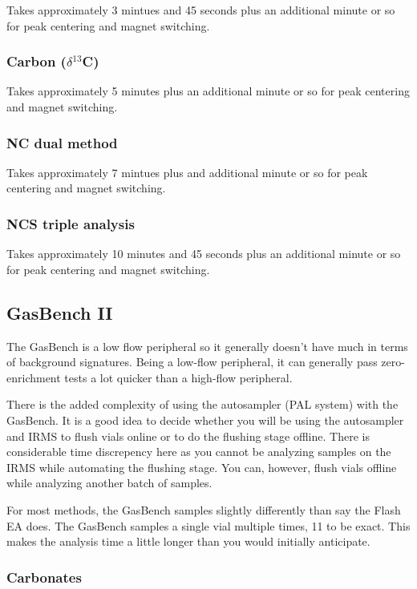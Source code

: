 \documentclass[12pt]{../SOP4_alpha}\usepackage[]{graphicx}\usepackage[]{color}
\begin{document}
\NP Takes approximately 3 mintues and 45 seconds plus an additional minute or so for peak centering and magnet switching.

\subsubsection{Carbon ($\delta$$^{13}$C)}

\NP Takes approximately 5 minutes plus an additional minute or so for peak centering and magnet switching.

\subsubsection{NC dual method}

\NP Takes approximately 7 mintues plus and additional minute or so for peak centering and magnet switching.

\subsubsection{NCS triple analysis} 

\NP Takes approximately 10 minutes and 45 seconds plus an additional minute or so for peak centering and magnet switching.

\subsection{GasBench II}

\NP The GasBench is a low flow peripheral so it generally doesn't have much in terms of background signatures. Being a low-flow peripheral, it can generally pass zero-enrichment tests a lot quicker than a high-flow peripheral.

\NP There is the added complexity of using the autosampler (PAL system) with the GasBench. It is a good idea to decide whether you will be using the autosampler and IRMS to flush vials online or to do the flushing stage offline. There is considerable time discrepency here as you cannot be analyzing samples on the IRMS while automating the flushing stage. You can, however, flush vials offline while analyzing another batch of samples.

\NP For most methods, the GasBench samples slightly differently than say the Flash EA does. The GasBench samples a single vial multiple times, 11 to be exact. This makes the analysis time a little longer than you would initially anticipate.

\subsubsection{Carbonates}
\end{document}
